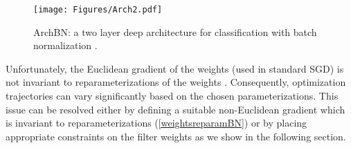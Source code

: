 \documentclass{article} %
\newcommand{\changeBM}[1]{#1} %
\newcommand{\changeVB}[1]{#1} %
\newcommand{\Diag}{{\rm Diag}}
\begin{document}
\begin{figure*}
\centering
\texttt{[image: Figures/Arch2.pdf]}
\caption{\footnotesize{ArchBN: a two layer deep architecture for classification with batch normalization \cite{BN}.}}
\label{ArchBN}
\end{figure*}

\changeVB{Unfortunately, the Euclidean gradient of the weights (used in standard SGD) is not invariant to reparameterizations of the weights \cite{PathSGD}. Consequently, optimization trajectories can vary significantly based on the chosen parameterizations. This issue can be resolved either by defining a suitable non-Euclidean gradient which is invariant to reparameterizations (\ref{weightsreparamBN}) or by placing appropriate constraints on the filter weights as we show in the following section.}




%
%
%
\end{document}

